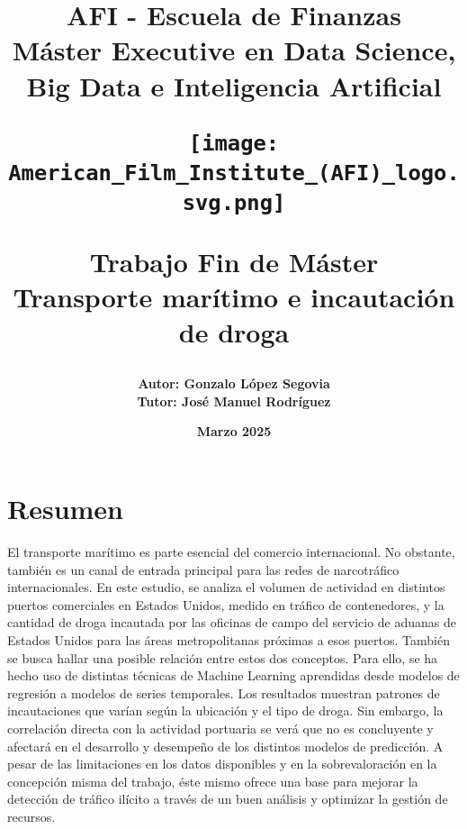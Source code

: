 \documentclass[12pt]{article}
\title{\bf AFI - Escuela de Finanzas\\
\vspace{3cm}
Máster Executive en Data Science, Big Data e Inteligencia Artificial\\
\vspace{2cm}
\begin{center}
	\hspace*{-2cm}
	\texttt{[image: American\_Film\_Institute\_(AFI)\_logo.svg.png]} \\
\end{center}

\vspace{2cm}
Trabajo Fin de Máster\\
\vspace{1cm}
Transporte marítimo e incautación de droga
}
\author{
		\bf Autor: Gonzalo López Segovia \\
		\bf Tutor: José Manuel Rodríguez
	}
\date{\bf Marzo 2025}
\begin{document}
	

	

\maketitle

\newpage

\tableofcontents

\newpage

\listoffigures

\newpage

\listoftables

\newpage

\section{\label{resumen}Resumen}
El transporte marítimo es parte esencial del comercio internacional. No obstante, también es un canal de entrada principal para las redes de narcotráfico internacionales. En este estudio, se analiza el volumen de actividad en distintos puertos comerciales en Estados Unidos, medido en tráfico de contenedores, y la cantidad de droga incautada por las oficinas de campo del servicio de aduanas de Estados Unidos para las áreas metropolitanas próximas a esos puertos. También se busca hallar una posible relación entre estos dos conceptos. Para ello, se ha hecho uso de distintas técnicas de Machine Learning aprendidas desde modelos de regresión a modelos de series temporales. Los resultados muestran patrones de incautaciones que varían según la ubicación y el tipo de droga. Sin embargo, la correlación directa con la actividad portuaria se verá que no es concluyente y afectará en el desarrollo y desempeño de los distintos modelos de predicción. A pesar de las limitaciones en los datos disponibles y en la sobrevaloración en la concepción misma del trabajo, éste mismo ofrece una base para mejorar la detección de tráfico ilícito a través de un buen análisis y optimizar la gestión de recursos.
\end{document}

